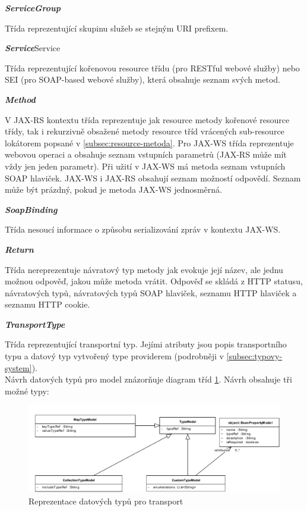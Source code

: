 \documentclass[11pt,twoside,a4paper]{book}
\begin{document}
\textbf{\textit{ServiceGroup}}

Třída reprezentující skupinu služeb se stejným URI prefixem.

\textbf{\textit{Service}}Service

Třída reprezentující kořenovou resource třídu (pro RESTful webové služby) nebo
SEI (pro SOAP-based webové služby), která obsahuje seznam svých metod.

\textbf{\textit{Method}}

V JAX-RS kontextu třída reprezentuje jak resource metody kořenové resource
třídy, tak i rekurzivně obsažené metody resource tříd vrácených sub-resource
lokátorem popsané v \ref{subsec:resource-metoda}.
Pro JAX-WS třída reprezentuje webovou operaci a obsahuje seznam vstupních
parametrů (JAX-RS může mít vždy jen jeden parametr). Při užití v JAX-WS má
metoda seznam vstupních SOAP hlaviček. JAX-WS i JAX-RS obsahují seznam možností
odpovědí.
Seznam může být prázdný, pokud je metoda JAX-WS jednosměrná.

\textbf{\textit{SoapBinding}}

Třída nesoucí informace o způsobu serializování zpráv v kontextu JAX-WS.

\textbf{\textit{Return}}

Třída nereprezentuje návratový typ metody jak evokuje její název, ale jednu možnou
odpověď, jakou může metoda vrátit. Odpověď se skládá z HTTP statusu, návratových typů,
návratových typů SOAP hlaviček, seznamu HTTP hlaviček a seznamu HTTP cookie.

\textbf{\textit{TransportType}}

Třída reprezentující transportní typ. Jejími atributy jsou popis transportního
typu a datový typ vytvořený type providerem (podrobněji v
\ref{subsec:typovy-system}).
\mbox{}\\
Návrh datových typů pro model znázorňuje diagram tříd \ref{fig:typovy-system}.
Návrh obsahuje tři možné typy:

\begin{figure}[h]
\begin{center}
\includegraphics[width=13cm]{images-pdf/TypeSystem.pdf}
\caption{Reprezentace datových typů pro transport}
\label{fig:typovy-system}
\end{center}
\end{figure}
\end{document}
